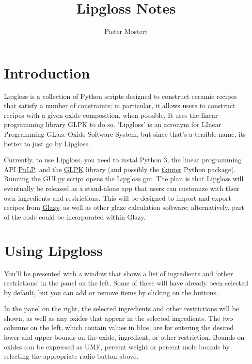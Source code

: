 \documentclass[a4paper,10pt]{article}
\title{Lipgloss Notes}
\author{Pieter Mostert}%
\def\'{\textquotesingle}
\begin{document}
\maketitle
\def\thefootnote{\fnsymbol{footnote}}\setcounter{footnote}{1}
\section{Introduction}
Lipgloss is a collection of Python scripts designed to construct ceramic recipes that satisfy a number of constraints; in particular, it allows users to construct recipes with a given oxide composition, when possible. It uses the linear programming library GLPK to do so. `Lipgloss' is an acronym for LInear Programming GLaze Oxide Software System, but since that's a terrible name, it\'s better to just go by Lipgloss.

Currently, to use Lipgloss, you need to instal Python 3, the linear programming API \href{https://github.com/coin-or/pulp}{PuLP}, and the \href{https://www.gnu.org/software/glpk/}{GLPK} library (and possibly the \href{https://wiki.python.org/moin/TkInter}{tkinter} Python package). Running the GUI.py script opens the Lipgloss gui. The plan is that Lipgloss will eventually be released as a stand-alone app that users can customize with their own ingredients and restrictions. This will be designed to import and export recipes from \href{https://glazy.org}{Glazy}, as well as other glaze calculation software; alternatively, part of the code could be incorporated within Glazy.

\section{Using Lipgloss}

You'll be presented with a window that shows a list of ingredients and `other restrictions' in the panel on the left. Some of these will have already been selected by default, but you can add or remove items by clicking on the buttons.

In the panel on the right, the selected ingredients and other restrictions will be shown, as well as any oxides that appear in the selected ingredients. The two columns on the left, which contain values in blue, are for entering the desired lower and upper bounds on the oxide, ingredient, or other restriction. Bounds on oxides can be expressed as UMF, percent weight or percent mole bounds by selecting the appropriate radio button above. 
\end{document}
